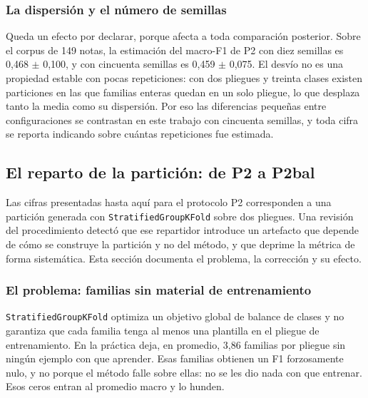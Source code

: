 \subsubsection*{La dispersión y el número de semillas}

Queda un efecto por declarar, porque afecta a toda comparación posterior. Sobre el corpus de 149 notas, la estimación del macro-F1 de P2 con diez semillas es 0,468 $\pm$ 0,100, y con cincuenta semillas es 0,459 $\pm$ 0,075. El desvío no es una propiedad estable con pocas repeticiones: con dos pliegues y treinta clases existen particiones en las que familias enteras quedan en un solo pliegue, lo que desplaza tanto la media como su dispersión. Por eso las diferencias pequeñas entre configuraciones se contrastan en este trabajo con cincuenta semillas, y toda cifra se reporta indicando sobre cuántas repeticiones fue estimada.


\subsection{El reparto de la partición: de P2 a P2bal}
\label{subsec:res_p2bal}

Las cifras presentadas hasta aquí para el protocolo P2 corresponden a una partición generada con \texttt{StratifiedGroupKFold} sobre dos pliegues. Una revisión del procedimiento detectó que ese repartidor introduce un artefacto que depende de cómo se construye la partición y no del método, y que deprime la métrica de forma sistemática. Esta sección documenta el problema, la corrección y su efecto.

\subsubsection*{El problema: familias sin material de entrenamiento}

\texttt{StratifiedGroupKFold} optimiza un objetivo global de balance de clases y no garantiza que cada familia tenga al menos una plantilla en el pliegue de entrenamiento. En la práctica deja, en promedio, 3,86 familias por pliegue sin ningún ejemplo con que aprender. Esas familias obtienen un F1 forzosamente nulo, y no porque el método falle sobre ellas: no se les dio nada con que entrenar. Esos ceros entran al promedio macro y lo hunden.

